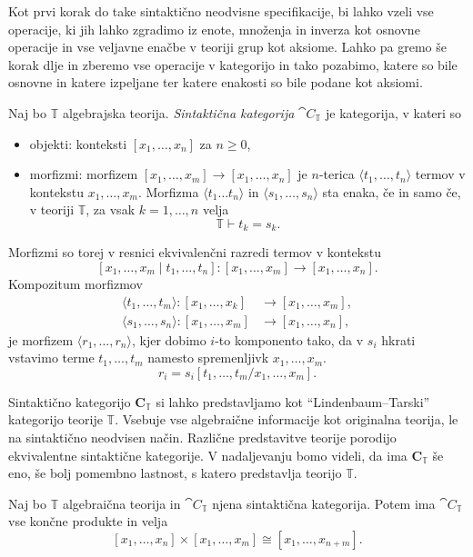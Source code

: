 \documentclass[../kategoricna_logika.tex]{subfiles}
\begin{document}
Kot prvi korak do take sintaktično neodvisne specifikacije,
bi lahko vzeli vse operacije, ki jih lahko zgradimo iz
enote, množenja in inverza kot osnovne operacije in vse
veljavne enačbe v teoriji grup kot aksiome. Lahko pa gremo še korak dlje
in zberemo vse operacije v kategorijo in tako pozabimo, katere so bile
osnovne in katere izpeljane ter katere enakosti so bile podane kot aksiomi.
%
\begin{definicija}
  Naj bo $\mathbb{T}$ algebrajska teorija.
  \emph{Sintaktična kategorija} $\cat{C}_\mathbb{T}$ je kategorija,
  v kateri so
  \begin{itemize}
  \item objekti: konteksti $[x_1, \ldots, x_n]$ za $n \geq 0$,
%
  \item morfizmi: morfizem $[x_1, \ldots, x_m] \to [x_1, \ldots, x_n]$
    je $n$-terica $\langle t_1, \ldots, t_n \rangle$ termov v kontekstu
    $x_1, \ldots, x_m$. Morfizma $\langle t_1 \ldots t_n \rangle$ in
    $\langle s_1, \ldots, s_n \rangle$ sta enaka, če in samo če,
    v teoriji $\mathbb{T}$, za vsak $k = 1, \ldots, n$ velja
    $$\mathbb{T} \vdash t_k = s_k.$$
\end{itemize}
%
Morfizmi so torej v resnici ekvivalenčni razredi termov v kontekstu
$$[x_1, \ldots, x_m \mid t_1, \ldots, t_n] : [x_1, \ldots, x_m] \to [x_1, \ldots, x_n].$$
%
Kompozitum morfizmov
  \begin{align*}
    \langle t_1, \ldots, t_m \rangle : [x_1, \ldots, x_k] &\to [x_1, \ldots, x_m], \\
    \langle s_1, \ldots, s_n \rangle : [x_1, \ldots, x_m] &\to [x_1, \ldots, x_n],
  \end{align*}
je morfizem $\langle r_1, \ldots, r_n \rangle$, kjer dobimo $i$-to komponento tako,
da v $s_i$ hkrati vstavimo terme $t_1, \ldots, t_m$ namesto
spremenljivk $x_1, \ldots, x_m$.
$$r_i = s_i[t_1, \ldots, t_m / x_1, \ldots, x_m].$$
%
\end{definicija}
Sintaktično kategorijo $\mathbf{C}_{\mathbb{T}}$ si lahko predstavljamo kot
"`Lindenbaum--Tarski"' kategorijo teorije $\mathbb{T}$. Vsebuje vse algebraične
informacije kot originalna teorija, le na sintaktično neodvisen način.
Različne predstavitve teorije porodijo ekvivalentne sintaktične
kategorije. V nadaljevanju bomo videli, da ima $\mathbf{C}_{\mathbb{T}}$ še eno,
še bolj pomembno lastnost, s katero predstavlja teorijo $\mathbb{T}$.
%
\begin{lema}
  Naj bo $\mathbb{T}$ algebraična teorija in $\cat{C}_\mathbb{T}$
  njena sintaktična kategorija. Potem ima $\cat{C}_\mathbb{T}$ vse
  končne produkte in velja
$$[x_1, \ldots, x_n] \times [x_1, \ldots, x_m] \cong [x_1, \ldots, x_{n+m}].$$
\end{lema}
\end{document}
